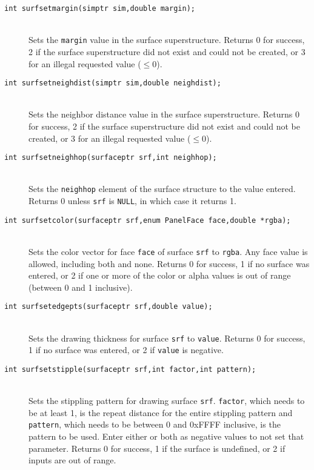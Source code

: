 \documentclass {book}
\begin{document}
\begin{description}
\item[\texttt{int surfsetmargin(simptr sim,double margin);}]
\hfill \\
Sets the \texttt{margin} value in the surface superstructure.  Returns 0 for success, 2 if the surface superstructure did not exist and could not be created, or 3 for an illegal requested value ($\leq 0$).

\item[\texttt{int surfsetneighdist(simptr sim,double neighdist);}]
\hfill \\
Sets the neighbor distance value in the surface superstructure.  Returns 0 for success, 2 if the surface superstructure did not exist and could not be created, or 3 for an illegal requested value ($\leq 0$).

\item[\texttt{int surfsetneighhop(surfaceptr srf,int neighhop);}]
\hfill \\
Sets the \texttt{neighhop} element of the surface structure to the value entered.  Returns 0 unless \texttt{srf} is \texttt{NULL}, in which case it returns 1.

\item[\texttt{int surfsetcolor(surfaceptr srf,enum PanelFace face,double *rgba);}]
\hfill \\
Sets the color vector for face \texttt{face} of surface \texttt{srf} to \texttt{rgba}.  Any face value is allowed, including both and none.  Returns 0 for success, 1 if no surface was entered, or 2 if one or more of the color or alpha values is out of range (between 0 and 1 inclusive).

\item[\texttt{int surfsetedgepts(surfaceptr srf,double value);}]
\hfill \\
Sets the drawing thickness for surface \texttt{srf} to \texttt{value}.  Returns 0 for success, 1 if no surface was entered, or 2 if \texttt{value} is negative.

\item[\texttt{int surfsetstipple(surfaceptr srf,int factor,int pattern);}]
\hfill \\
Sets the stippling pattern for drawing surface \texttt{srf}.  \texttt{factor}, which needs to be at least 1, is the repeat distance for the entire stippling pattern and \texttt{pattern}, which needs to be between 0 and 0xFFFF inclusive, is the pattern to be used.  Enter either or both as negative values to not set that parameter.  Returns 0 for success, 1 if the surface is undefined, or 2 if inputs are out of range.


\end{description}
\end{document}
